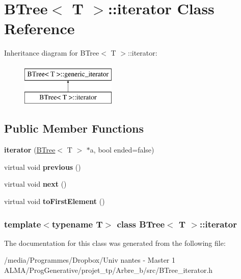 \hypertarget{classBTree_1_1iterator}{
\section{BTree$<$ T $>$::iterator Class Reference}
\label{classBTree_1_1iterator}
}
Inheritance diagram for BTree$<$ T $>$::iterator:\begin{figure}[H]
\begin{center}
\leavevmode
\includegraphics[height=2.000000cm]{classBTree_1_1iterator}
\end{center}
\end{figure}
\subsection*{Public Member Functions}
\begin{DoxyCompactItemize}
\item 
\hypertarget{classBTree_1_1iterator_a0d7daebb91dc750f1403c66a1632e1ae}{
{\bfseries iterator} (\hyperlink{classBTree}{BTree}$<$ T $>$ $\ast$a, bool ended=false)}
\label{classBTree_1_1iterator_a0d7daebb91dc750f1403c66a1632e1ae}

\item 
\hypertarget{classBTree_1_1iterator_abfda500a8a20422b6a191b199d2eb9d5}{
virtual void {\bfseries previous} ()}
\label{classBTree_1_1iterator_abfda500a8a20422b6a191b199d2eb9d5}

\item 
\hypertarget{classBTree_1_1iterator_a44d8ed859bc18eed5a9a70e11df4fb0a}{
virtual void {\bfseries next} ()}
\label{classBTree_1_1iterator_a44d8ed859bc18eed5a9a70e11df4fb0a}

\item 
\hypertarget{classBTree_1_1iterator_a5fa225385afdfa78d230cbb8e6abeee5}{
virtual void {\bfseries toFirstElement} ()}
\label{classBTree_1_1iterator_a5fa225385afdfa78d230cbb8e6abeee5}

\end{DoxyCompactItemize}
\subsubsection*{template$<$typename T$>$ class BTree$<$ T $>$::iterator}



The documentation for this class was generated from the following file:\begin{DoxyCompactItemize}
\item 
/media/Programmes/Dropbox/Univ nantes -\/ Master 1 ALMA/ProgGenerative/projet\_\-tp/Arbre\_\-b/src/BTree\_\-iterator.h\end{DoxyCompactItemize}
